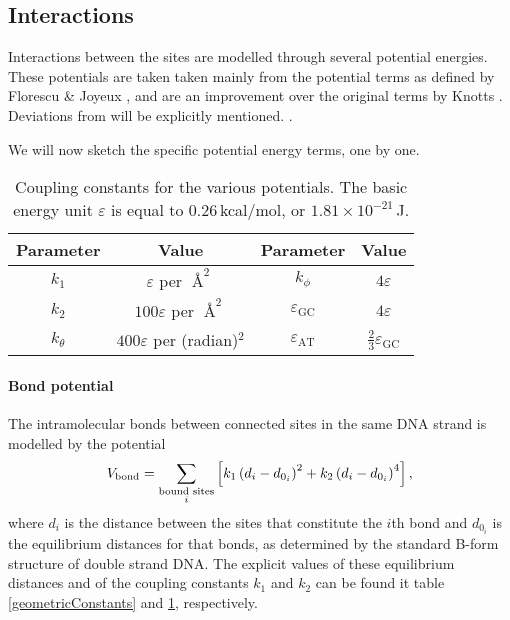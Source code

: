 \subsection{Interactions}

Interactions between the sites are modelled through several potential energies.
These potentials are taken taken mainly from the potential terms as defined by Florescu \& Joyeux \cite{florescu2011thermal}, and are an improvement over the original terms by Knotts \etal \cite{knotts2007coarse}. Deviations from \cite{florescu2011thermal} will be explicitly mentioned.
 .

We will now sketch the specific potential energy terms, one by one.

\begin{table}[hbt]
\label{couplingConstants}
\begin{center}
\caption{Coupling constants for the various potentials. The basic energy unit $\varepsilon$ is equal to $0.26$\,kcal/mol, or $1.81 \times 10^{-21}$\,J.}

\begin{tabular}{cc||cc}
Parameter & Value & Parameter & Value\\\hline
$k_1$ & $\varepsilon$ per $\Angstrom^2$ &
	$k_\phi$ & $4\varepsilon$ \\
$k_2$ & $100\varepsilon$ per $\Angstrom^2$ &
	$\varepsilon_\text{GC}$ & $4\varepsilon$\\
$k_\theta$ & $400\varepsilon$ per (radian)$^2$ &
	$\varepsilon_\text{AT}$ & $\frac{2}{3} \varepsilon_\text{GC}$ \\
\end{tabular}
\end{center}
\end{table}


\paragraph{Bond potential}
The intramolecular bonds between connected sites in the same DNA strand is modelled by the potential
\begin{equation}
V_\text{bond}
= \sum_{\substack{\text{bound sites}\\i}} \left[
	k_1 \left(d_i - d_{0_i}\right)^2
	+ k_2 \left(d_i - d_{0_i}\right)^4
\right],
\end{equation}
where $d_i$ is the distance between the sites that constitute the $i$th bond and $d_{0_i}$ is the equilibrium distances for that bonds, as determined by the standard B-form structure of double strand DNA. The explicit values of these equilibrium distances and of the coupling constants $k_1$ and $k_2$ can be found it table \ref{geometricConstants} and \ref{couplingConstants}, respectively.


